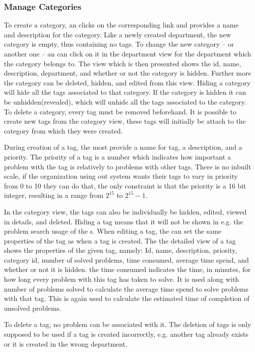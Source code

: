 \subsubsection{Manage Categories}
To create a category, an \admin[] clicks on the corresponding link and provides a name and description for the category.
Like a newly created department, the new category is empty, thus containing no tags.
To change the new category -- or another one -- an \admin[] can click on it in the department view for the department which the category belongs to.
The view which is then presented shows the id, name, description, department, and whether or not the category is hidden.
Further more the category can be deleted, hidden, and edited from this view.
Hiding a category will hide all the tags associated to that category.
If the category is hidden it can be unhidden(revealed), which will unhide all the tags associated to the category.
To delete a category, every tag must be removed beforehand.
It is possible to create new tags from the category view, these tags will initially be attach to the category from which they were created.

During creation of a tag, the \admin[] most provide a name for tag, a description, and a priority.
The priority of a tag is a number which indicates how important a problem with the tag is relatively to problems with other tags.
There is no inbuilt scale, if the organization using out system wants their tags to vary in priority from 0 to 10 they can do that, the only constraint is that the priority is a 16 bit integer, resulting in a range from $2^{15}$ to $2^{15}-1$.

In the category view, the tags can also be individually be hidden, edited, viewed in details, and deleted.
Hiding a tag means that it will not be shown in e.g. the problem search usage of the \aclient[]s.
When editing a tag, the \admin[]can set the same properties of the tag as when a tag is created.
The the detailed view of a tag shows the properties of the given tag, namely: Id, name, description, priority, category id, number of solved problems, time consumed, average time spend, and whether or not it is hidden.
the time consumed indicates the time, in minutes, for how long every problem with this tag has taken to solve.
It is used along with number of problems solved to calculate the average time spend to solve problems with that tag.
This is again used to calculate the estimated time of completion of unsolved problems.

To delete a tag, no problem can be associated with it.
The deletion of tags is only supposed to be used if a tag is created incorrectly, e.g. another tag already exists or it is created in the wrong department.

\subsection{\gstat[c]}